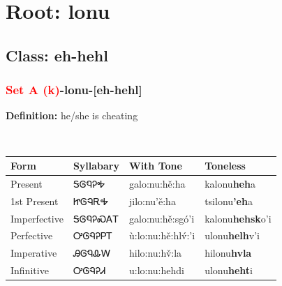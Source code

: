 \needspace{4in}
\section*{Root: lonu}
\nopagebreak
{}
\needspace{3in}
\subsection*{Class: eh-hehl}
\nopagebreak
\needspace{2in}
\subsubsection*{\textcolor{Red}{Set A (k)}{-}\textbf{lonu}{-}[eh-hehl]}
\nopagebreak
\textbf{Definition: } he/she is cheating
\\[0.5em]
\begin{tabularx}{\textwidth}{l X X X}%
\toprule%
\textbf{Form}&\textbf{Syllabary}&\textbf{With Tone}&\textbf{Toneless}\\%
\midrule%
Present&ᎦᎶᏄᎮᎭ&galo:nu:hě:ha&kalonu\textbf{heh}a\\%
1st Present&ᏥᎶᏄᎡᎭ&jilo:nu’ě:ha&tsilonu\textbf{'eh}a\\%
Imperfective&ᎦᎶᏄᎮᏍᎪᎢ&galo:nu:hě:sgó’i&kalonu\textbf{hehsk}o'i\\%
Perfective&ᎤᎶᏄᎮᏢᎢ&ù:lo:nu:hě:hlv́:’i&ulonu\textbf{helh}v'i\\%
Imperative&ᎯᎶᏄᎲᎳ&hilo:nu:hv̌:la&hilonu\textbf{hvla}\\%
Infinitive&ᎤᎶᏄᎮᏗ&u:lo:nu:hehdi&ulonu\textbf{heht}i\\%
\bottomrule%
\end{tabularx}
\\[1em]